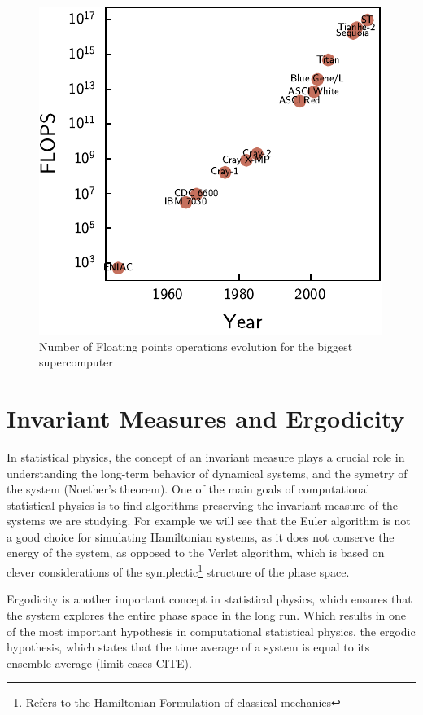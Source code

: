 \documentclass[ansiapaper]{report}
\begin{document}
\begin{multicols}{3}
	\begin{figure}[H]
		\centering
		\includegraphics[width=1\linewidth]{./figures/supercomputer_flops.pdf}
		\caption{Number of Floating points operations evolution for the biggest supercomputer \label{fig:supercomputer_flops}}
	\end{figure}

	\section{Invariant Measures and Ergodicity}

	In statistical physics, the concept of an invariant measure plays a crucial role in understanding the long-term behavior of dynamical systems, and the symetry of the system (Noether's theorem). One of the main goals of computational statistical physics is to find algorithms preserving the invariant measure of the systems we are studying. For example we will see that the Euler algorithm is not a good choice for simulating Hamiltonian systems, as it does not conserve the energy of the system, as opposed to the Verlet algorithm, which is based on clever considerations of the symplectic\footnote{Refers to the Hamiltonian Formulation of classical mechanics} structure of the phase space.

	Ergodicity is another important concept in statistical physics, which ensures that the system explores the entire phase space in the long run. Which results in one of the most important hypothesis in computational statistical physics, the ergodic hypothesis, which states that the time average of a system is equal to its ensemble average (limit cases CITE).


\end{multicols}
\end{document}
